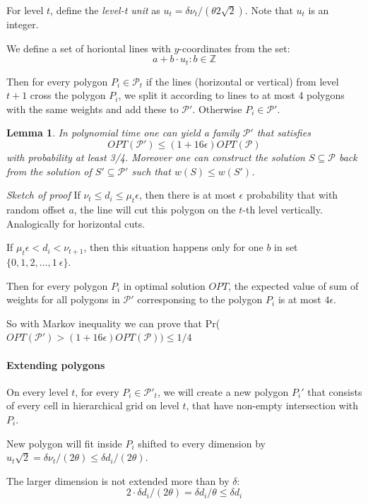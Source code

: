 \documentclass[en]{pracamgr}
\newtheorem{lemma}{Lemma}[section]
\begin{document}
For level $t$, define the \textit{level-t unit}
as $u_t = \delta \nu_t/(\theta 2\sqrt{2})$.
Note that $u_t$ is an integer.

We define a set of horiontal lines with $y$-coordinates
from the set:
$$a + b \cdot u_t : b \in \mathbb{Z}$$

Then for every polygon $P_i \in \mathcal{P}_t$
if the lines (horizontal or vertical)
from level $t+1$ cross the polygon $P_i$,
we split it according to lines
to at most 4 polygons with the
same weights and add these to $\mathcal{P'}$.
Otherwise $P_i \in \mathcal{P'}$.

\begin{lemma}
In polynomial time one can yield a family $\mathcal{P'}$
that satisfies $$OPT(\mathcal{P'}) \le (1+16\epsilon)OPT(\mathcal{P})$$
with probability at least 3/4.
Moreover one can construct the solution $S \subseteq \mathcal{P}$
back from the solution of $S' \subseteq \mathcal{P'}$
such that $w(S) \le w(S')$.
\end{lemma}

\textit{Sketch of proof}
If $\nu_t \le d_i \le \mu_t\epsilon$, then there is at most
$\epsilon$ probability that with random offset $a$,
the line will cut this polygon on the $t$-th level vertically.
Analogically for horizontal cuts.

If $\mu_t\epsilon < d_i < \nu_{t+1}$, then this situation happens
only for one $b$ in set $\{0, 1, 2, \ldots, 1\ \epsilon\}$.

Then for every polygon $P_i$ in optimal solution $OPT$, the expected value
of sum of weights for all polygons in $\mathcal{P'}$
corresponsing to the polygon $P_i$ is at most $4\epsilon$.

So with Markov inequality we can prove that
Pr($OPT(\mathcal{P'}) > (1+16\epsilon)OPT(\mathcal{P})) \le 1/4$

\paragraph{Extending polygons}
On every level $t$, for every $P_i \in \mathcal{P'}_t$,
we will create a new polygon $P_i'$ that
consists of every cell in hierarchical grid on level $t$,
that have non-empty intersection with $P_i$.

New polygon will fit inside $P_i$ shifted to every dimension by
$u_t\sqrt{2} = \delta \nu_t/(2\theta) \le \delta d_i/(2\theta)$.

The larger dimension is not extended more than by $\delta$:
$$2 \cdot \delta d_i/(2\theta) = \delta d_i/\theta \le \delta d_i$$
\end{document}

